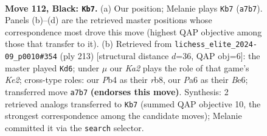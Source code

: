 \documentclass[11pt]{article}
\begin{document}
\begin{figure}[p]\centering
\begin{subfigure}{0.46\textwidth}\centering
\resizebox{\linewidth}{!}{%
\newchessgame
\chessboard[
  setfen={8/k7/p5r1/P1p2p1p/1p3P1P/1P2PKPR/8/8 b - - 12 112},
  showmover=false,
  pgfstyle=straightmove, color=movearrow, markmove={a7-b7}
]}
\caption{}
\end{subfigure}\hfill
\begin{subfigure}{0.46\textwidth}\centering
\resizebox{\linewidth}{!}{%
\newchessgame
\chessboard[
  setfen={1R6/4k3/4b1p1/2p4p/p1r4P/P1B2PK1/1P4P1/8 b - - 35 107},
  showmover=false,
  pgfstyle=straightmove, color=movearrow, markmove={e7-d6}
]}
\caption{}
\end{subfigure}
\\[4pt]

\caption{\textbf{Move 112, Black: \texttt{Kb7}.} (a) Our position; Melanie plays \texttt{Kb7} (\texttt{a7b7}). Panels (b)--(d) are the retrieved master positions whose correspondence most drove this move (highest QAP objective among those that transfer to it). (b) Retrieved from \texttt{lichess\_elite\_2024-09\_p0010\#354} (ply 213) [structural distance $d$=36, QAP obj=6]: the master played \texttt{Kd6}; under $\mu$ our \emph{Ka2} plays the role of that game's \emph{Ke2}; cross-type roles: our \emph{P}b4 as their \emph{r}b8, our \emph{P}a6 as their \emph{B}e6; transferred move \texttt{a7b7} \textbf{(endorses this move)}. Synthesis: 2 retrieved analogs transferred to \texttt{Kb7} (summed QAP objective 10, the strongest correspondence among the candidate moves); Melanie committed it via the \texttt{search} selector.}
\label{fig:thought-m223}
\end{figure}

\clearpage
\end{document}
